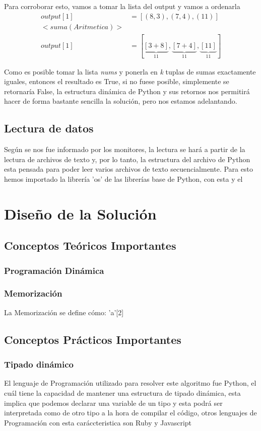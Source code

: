 \documentclass[a4paper]{article}
\begin{document}
Para corroborar esto, vamos a tomar la lista del output y vamos a ordenarla
\begin{align*}
    output[1] &= [(8,3), (7,4), (11)] \\
    <suma (Aritmetica)> \\
    output[1] &= [\underset{11}{\underbrace{[3 + 8]}},
    \underset{11}{\underbrace{[7 + 4]}},
    \underset{11}{\underbrace{[11]}}]
\end{align*} 

Como es posible tomar la lista \textit{nums} y ponerla en \textit{k} tuplas de
sumas exactamente iguales, entonces el resultado es True, si no fuese posible, simplemente
se retornaría False, la estructura dinámica de Python y sus retornos nos permitirá hacer
de forma bastante sencilla la solución, pero nos estamos adelantando.

\subsection{Lectura de datos}
Según se nos fue informado por los monitores, la lectura se hará a partir de la lectura
de archivos de texto y, por lo tanto, la estructura del archivo de Python esta pensada para
poder leer varios archivos de texto secuencialmente. Para esto hemos importado la librería 'os'
de las librerías base de Python, con esta y el 
\section{Diseño de la Solución}
\subsection{Conceptos Teóricos Importantes}
\subsubsection{Programación Dinámica}

\subsubsection{Memorización}
La Memorización se define cómo: 'a'[2]

\subsection{Conceptos Prácticos Importantes}
\subsubsection{Tipado dinámico}
El lenguaje de Programación utilizado para resolver este algoritmo fue Python,
el cuál tiene la capacidad de mantener una estructura de tipado dinámica, esta
implica que podemos declarar una variable de un tipo y esta podrá ser interpretada
como de otro tipo a la hora de compilar el código, otros lenguajes de Programación
con esta caráccteristica son Ruby y Javascript
\end{document}
